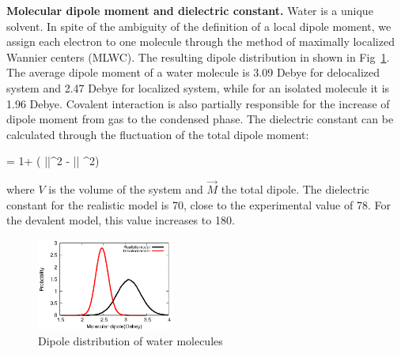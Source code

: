 \documentclass[prl,twocolumn,showpacs]{revtex4}
\begin{document}
\textbf{Molecular dipole moment and dielectric constant.} Water is a unique solvent. In spite of the ambiguity of the definition of a local dipole moment, we assign each electron to one molecule through the method of maximally localized Wannier centers (MLWC). The resulting dipole distribution in shown in Fig~\ref{Fig:dipoledist}. The average dipole moment of a water molecule is 3.09 Debye for delocalized system and 2.47 Debye for localized system, while for an isolated molecule it is 1.96 Debye. \new Covalent interaction is also partially responsible for the increase of dipole moment from gas to the condensed phase. \old The dielectric constant can be calculated through the fluctuation of the total dipole moment\cite{neumann1983dipole,adams1981theory}:

\bea
\epsilon = 1+  (  \langle ||^2 \rangle  - \langle || \rangle ^2) \label{Eq:dielectric}
\eea

where $V$ is the volume of the system and $\vec{M}$ the total dipole. The dielectric constant for the realistic model is 70, close to the experimental value of 78. For the devalent model, this value increases to 180.

\begin{figure}
\includegraphics[width=0.4\textwidth]{new_dipole}
\caption{Dipole distribution of water molecules} \label{Fig:dipoledist}
\end{figure}
\end{document}
